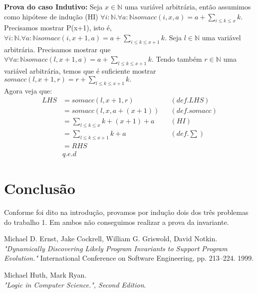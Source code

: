 \documentclass{article}
\begin{document}
\textbf{Prova do caso Indutivo:} Seja $x \in \mathbb{N}$ uma variável arbitrária, então assumimos como hipótese
de indução (HI) $\forall i:\mathbb{N}.\forall a:\mathbb{N} somacc(i, x, a) = a + \sum\limits_{i \le k \le x} k.$
Precisamos mostrar P(x+1), isto é,
$\forall i:\mathbb{N}.\forall a:\mathbb{N} somacc(i, x+1, a) = a + \sum\limits_{i \le k \le x+1} k.$
Seja $l \in \mathbb{N}$ uma variável arbitrária. Precisamos  mostrar que
$\forall \forall a:\mathbb{N} somacc(l, x+1, a) = a + \sum\limits_{l \le k \le x+1} k.$
Tendo também $r \in \mathbb{N}$ uma variável arbitrária, temos que é suficiente mostrar
$somacc(l, x+1, r) = r + \sum\limits_{l \le k \le x+1} k.$\\
Agora veja que:
\begin{align*}
LHS &= somacc(l, x+1, r) && (def. LHS)\\
&= somacc(l, x, a+(x+1)) && (def. somacc)\\
&= \sum\limits_{l \le k \le x} k + (x+1) + a && (HI)\\
&= \sum\limits_{l \le k \le x+1} k + a && (def. \sum)\\
&= RHS\\
& q.e.d
\end{align*}
\section{Conclusão}
Conforme foi dito na introdução, provamos por indução dois dos três problemas do trabalho 1.
Em ambos não conseguimos realizar a prova da invariante.

\begin{thebibliography}{9}
	Michael D. Ernst, Jake Cockrell, William G. Griswold, David Notkin.\\
	\emph{"Dynamically Discovering Likely Program Invariants to Support Program Evolution."}
	International Conference on Software Engineering, pp. 213–224. 1999.

	Michael Huth, Mark Ryan.\\
	\emph{"Logic in Computer Science.", Second Edition}.
\end{thebibliography}
\end{document}
